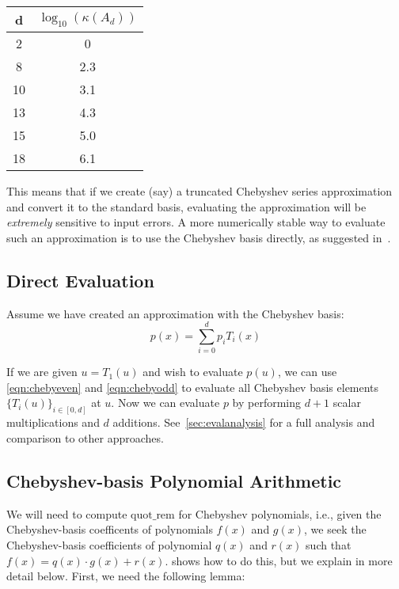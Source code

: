 \documentclass[../fheimpl.tex]{subfiles}
\begin{document}
	\begin{center}
		\begin{tabular}{ |c|c| } 
			\hline
			d & $\log_{10}(\kappa(A_d))$ \\ 
			\hline
			2 & 0 \\
			8 & 2.3 \\ 
			10 & 3.1 \\ 
			13 & 4.3 \\ 
			15 & 5.0 \\ 
			18 & 6.1 \\ 
			\hline
		\end{tabular}
	\end{center}
	
	This means that if we create (say) a truncated Chebyshev series approximation and convert it to the standard basis, evaluating the approximation will be \emph{extremely} sensitive to input errors. A more numerically stable way to evaluate such an approximation is to use the Chebyshev basis directly, as suggested in~\cite{cryptoeprint:2018/1043}.
	
	
	\subsection{Direct Evaluation}
	Assume we have created an approximation with the Chebyshev basis:
	\[p(x)=\sum_{i=0}^d p_iT_i(x)\]
	
	If we are given $u=T_1(u)$ and wish to evaluate $p(u)$, we can use \cref{eqn:chebyeven} and \ref{eqn:chebyodd} to evaluate all Chebyshev basis elements $\{T_i(u)\}_{i\in [0, d]}$ at $u$. Now we can evaluate $p$ by performing $d+1$ scalar multiplications and $d$ additions. See~\cref{sec:evalanalysis} for a full analysis and comparison to other approaches.	
	
	\subsection{Chebyshev-basis Polynomial Arithmetic}
	We will need to compute $\text{quot\_rem}$ for Chebyshev polynomials, i.e., given the Chebyshev-basis coefficents of polynomials $f(x)$ and $g(x)$, we seek the Chebyshev-basis coefficients of polynomial $q(x)$ and $r(x)$ such that $f(x) = q(x)\cdot g(x) + r(x)$. \cite{cryptoeprint:2018/1043} shows how to do this, but we explain in more detail below. First, we need the following lemma:
	
\end{document}

